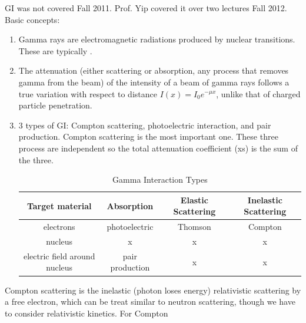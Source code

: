 \documentclass{school-22.101-notes}
\date{December 13, 2011}
\begin{document}
\maketitle

\clearpage
{}
GI was not covered Fall 2011. Prof. Yip covered it over two lectures Fall 2012. Basic concepts: 
\begin{enumerate}
\item Gamma rays are electromagnetic radiations produced by nuclear transitions. These are typically . 

\item The attenuation (either scattering or absorption, any process that removes gamma from the beam) of the intensity of a beam of gamma rays follows a true  variation with respect to distance $I(x) = I_0 e^{-\mu x}$, unlike that of charged particle penetration. 

\item 3 types of GI: Compton scattering, photoelectric interaction, and pair production. Compton scattering is the most important one. These three process are independent so the total attenuation coefficient (xs) is the sum of the three. 
  \begin{table}[ht]
    \centering
    \begin{tabular}{cccc} \hline
      Target material& Absorption & Elastic Scattering & Inelastic Scattering \\  \hline \hline
      electrons & photoelectric & Thomson & Compton \\  \hline
      nucleus & x & x & x \\ \hline
      electric field around nucleus & pair production & x & x \\ \hline
    \end{tabular}
    \caption{Gamma Interaction Types}
  \end{table}

\end{enumerate}

Compton scattering is the inelastic (photon loses energy) relativistic scattering by a free electron,  
which can be treat similar to neutron scattering, though we have to consider relativistic kinetics. For Compton
\end{document}
